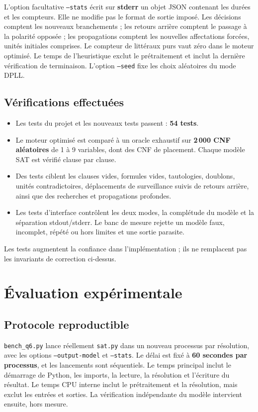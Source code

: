 \documentclass[10pt,a4paper]{article}
\begin{document}
L'option facultative \texttt{--stats} écrit sur \textbf{stderr} un objet
JSON contenant les durées et les compteurs. Elle ne modifie pas le format
de sortie imposé. Les décisions comptent les nouveaux branchements ; les
retours arrière comptent le passage à la polarité opposée ; les
propagations comptent les nouvelles affectations forcées, unités initiales
comprises. Le compteur de littéraux purs vaut zéro dans le moteur optimisé.
Le temps de l'heuristique exclut le prétraitement et inclut la dernière
vérification de terminaison. L'option \texttt{--seed} fixe les choix
aléatoires du mode DPLL.

\subsection{Vérifications effectuées}

\begin{itemize}
  \item Les tests du projet et les nouveaux tests passent : \textbf{54 tests}.
  \item Le moteur optimisé est comparé à un oracle exhaustif sur
    \textbf{2\,000 CNF aléatoires} de 1 à 9 variables, dont des CNF de
    placement. Chaque modèle SAT est vérifié clause par clause.
  \item Des tests ciblent les clauses vides, formules vides, tautologies,
    doublons, unités contradictoires, déplacements de surveillance suivis
    de retours arrière, ainsi que des recherches et propagations profondes.
  \item Les tests d'interface contrôlent les deux modes, la complétude du
    modèle et la séparation stdout/stderr. Le banc de mesure rejette un
    modèle faux, incomplet, répété ou hors limites et une sortie parasite.
\end{itemize}
Les tests augmentent la confiance dans l'implémentation ; ils ne remplacent
pas les invariants de correction ci-dessus.

\clearpage
\section{Évaluation expérimentale}

\subsection{Protocole reproductible}

\texttt{bench\_q6.py} lance réellement \texttt{sat.py} dans un nouveau
processus par résolution, avec les options \texttt{--output-model} et \texttt{--stats}.
Le délai est fixé à \textbf{60 secondes par processus}, et les lancements
sont séquentiels. Le temps principal inclut le démarrage de Python, les
imports, la lecture, la résolution et l'écriture du résultat. Le temps CPU
interne inclut le prétraitement et la résolution, mais exclut les entrées
et sorties. La vérification indépendante du modèle intervient ensuite,
hors mesure.
\end{document}
